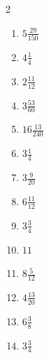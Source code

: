 \documentclass[12pt]{article}
\begin{document}
\begin{multicols}{2}
\begin{enumerate}
\item $ 5 \frac{29}{150} $
\item $ 4 \frac{1}{4} $
\item $ 2 \frac{11}{12} $
\item $ 3 \frac{53}{60} $
\item $ 16 \frac{13}{240} $
\item $ 3 \frac{1}{4} $
\item $ 3 \frac{9}{20} $
\item $ 6 \frac{11}{12} $
\item $ 3 \frac{3}{4} $
\item $ 11 $
\item $ 8 \frac{5}{12} $
\item $ 4 \frac{13}{20} $
\item $ 6 \frac{3}{8} $
\item $ 3 \frac{3}{4} $
\end{enumerate}\end{multicols}\newpage
\end{document}
